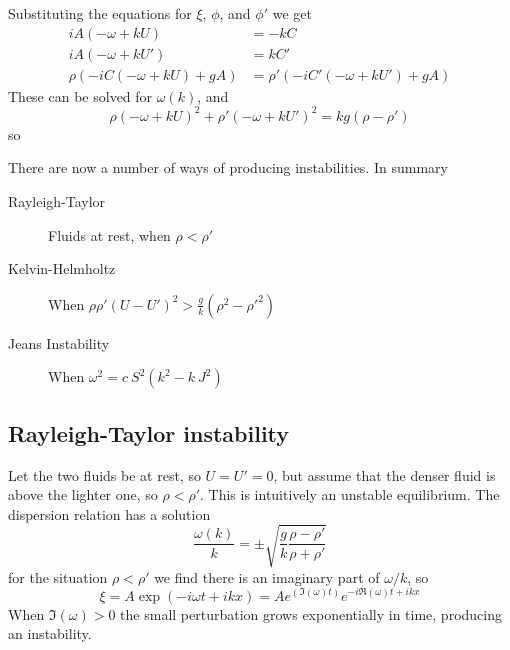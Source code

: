 Substituting the equations for $\xi$, $\phi$, and $\phi'$ we get
\begin{subequations}
  \begin{align}
    iA (-\omega +kU) &= -k C \\
iA (-\omega +kU') &= k C' \\
\rho(-iC (-\omega +kU) +gA) &= \rho'(-iC'(-\omega+kU')+gA)
  \end{align}
\end{subequations}
These can be solved for $\omega(k)$, and
\begin{equation}
  \label{eq:55}
  \rho (-\omega + kU)^2 + \rho' (-\omega + kU')^2 = kg(\rho-\rho')
\end{equation}
so

There are now a number of ways of producing instabilities. In summary
\begin{description}
\item[Rayleigh-Taylor] Fluids at rest, when $\rho < \rho'$
\item[Kelvin-Helmholtz] When $\rho \rho' (U-U')^2 > \frac{g}{k} (\rho^2 - \rho'^2)$
\item[Jeans Instability] When $\omega^2 = c~S^2 (k^2 - k~J^2)$
\end{description}

\subsection{Rayleigh-Taylor instability}
\label{sec:rayl-tayl-inst}

Let the two fluids be at rest, so $U=U'=0$, but assume that the denser
fluid is above the lighter one, so $\rho<\rho'$. This is intuitively
an unstable equilibrium. The dispersion relation has a solution
\begin{equation}
  \label{eq:57}
  \frac{\omega(k)}{k} = \pm \sqrt{\frac{g}{k} \frac{\rho-\rho'}{\rho+\rho'}}
\end{equation}
for the situation $\rho<\rho'$ we find there is an imaginary part of
$\omega/k$, so
\[ \xi = A \exp(-i \omega t + i k x) = A e^{( \Im(\omega) t) }e^{ -i
\Re(\omega) t + i k x} \] When $\Im(\omega)>0$ the small perturbation
grows exponentially in time, producing an instability.

